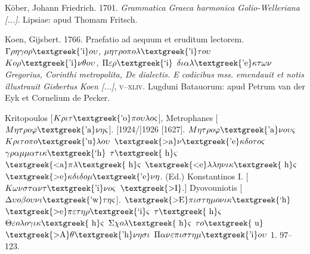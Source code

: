 \begin{styleStandard}
Köber, Johann Friedrich. 1701. \textit{Grammatica Graeca harmonica Golio-Welleriana [...]}. Lipsiae: apud Thomam Fritsch.
\end{styleStandard}

\begin{styleStandard}
Koen, Gijsbert. 1766. Praefatio ad aequum et eruditum lectorem. \textit{$\Gamma \rho \eta \gamma o\rho \text{\textgreek{'i}}o\upsilon $, $\mu \eta \tau \rho o\pi o\lambda \text{\textgreek{'i}}\tau o\upsilon $ $Ko\rho \text{\textgreek{'i}}\nu \theta o\upsilon $, $\Pi \varepsilon \rho \text{\textgreek{`i}}$ $\delta \iota \alpha \lambda \text{\textgreek{'e}}\kappa \tau \omega \nu $ {\textbar} Gregorius, Corinthi metropolita, De dialectis. E codicibus mss. emendauit et notis illustrauit Gisbertus Koen [...]}, \textsc{v}–\textsc{xliv}. Lugduni Batauorum: apud Petrum van der Eyk et Cornelium de Pecker.
\end{styleStandard}

\begin{styleStandard}
Kritopoulos [$K\rho \iota \tau \text{\textgreek{'o}}\pi o\upsilon \lambda o\varsigma $], Metrophanes [$M\eta \tau \rho o\varphi \text{\textgreek{'a}}\nu \eta \varsigma $]. [1924/]1926 [1627]. $M\eta \tau \rho o\varphi \text{\textgreek{'a}}\nu o\upsilon \varsigma $ $K\rho \iota \tau o\pi o\text{\textgreek{'u}}\lambda o\upsilon $ $\text{\textgreek{>a}}\nu \text{\textgreek{'e}}\kappa \delta o\tau o\varsigma $ $\gamma \rho \alpha \mu \mu \alpha \tau \iota \kappa \text{\textgreek{`h}}$ $\tau \text{\textgreek{~h}}\varsigma $ $\text{\textgreek{<a}}\pi \lambda \text{\textgreek{~h}}\varsigma $ $\text{\textgreek{<e}}\lambda \lambda \eta \nu \iota \kappa \text{\textgreek{~h}}\varsigma $ $\text{\textgreek{>e}}\kappa \delta \iota \delta o\mu \text{\textgreek{'e}}\nu \eta $. (Ed.) Konstantinos I. [$K\omega \nu \sigma \tau \alpha \nu \tau \text{\textgreek{'i}}\nu o\varsigma $ $\text{\textgreek{>I}}$.] Dyovouniotis [$\Delta \upsilon o\beta o\upsilon \nu \iota \text{\textgreek{'w}}\tau \eta \varsigma $]. \textit{$\text{\textgreek{>E}}\pi \iota \sigma \tau \eta \mu o\nu \iota \kappa \text{\textgreek{`h}}$ $\text{\textgreek{>e}}\pi \varepsilon \tau \eta \rho \text{\textgreek{`i}}\varsigma $ $\tau \text{\textgreek{~h}}\varsigma $ $\Theta \varepsilon o\lambda o\gamma \iota \kappa \text{\textgreek{~h}}\varsigma $ $\Sigma \chi o\lambda \text{\textgreek{~h}}\varsigma $ $\tau o\text{\textgreek{~u}}$ $\text{\textgreek{>A}}\theta \text{\textgreek{'h}}\nu \eta \sigma \iota $ $\Pi \alpha \nu \varepsilon \pi \iota \sigma \tau \eta \mu \text{\textgreek{'i}}o\upsilon $} 1. 97–123.
\end{styleStandard}

